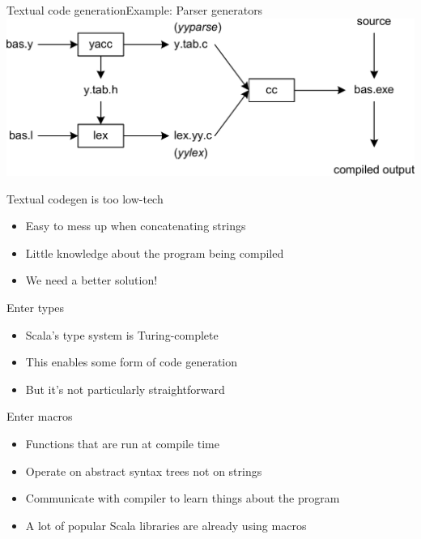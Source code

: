 \documentclass{beamer}
\begin{document}
\begin{frame}[fragile]{Textual code generation}{Example: Parser generators}
  \includegraphics[width=\linewidth]{img/yacc.png}
\end{frame}

\begin{frame}[fragile]{Textual codegen is too low-tech}
  \begin{itemize}
    \item Easy to mess up when concatenating strings
    \item Little knowledge about the program being compiled
    \item We need a better solution!
  \end{itemize}
\end{frame}

\begin{frame}{Enter types}
  \begin{itemize}
    \item Scala's type system is Turing-complete
    \item This enables some form of code generation
    \item But it's not particularly straightforward
  \end{itemize}
\end{frame}


\begin{frame}{Enter macros}
  \begin{itemize}
    \item Functions that are run at compile time
    \item Operate on abstract syntax trees not on strings
    \item Communicate with compiler to learn things about the program
    \item A lot of popular Scala libraries are already using macros
  \end{itemize}
\end{frame}
\end{document}
